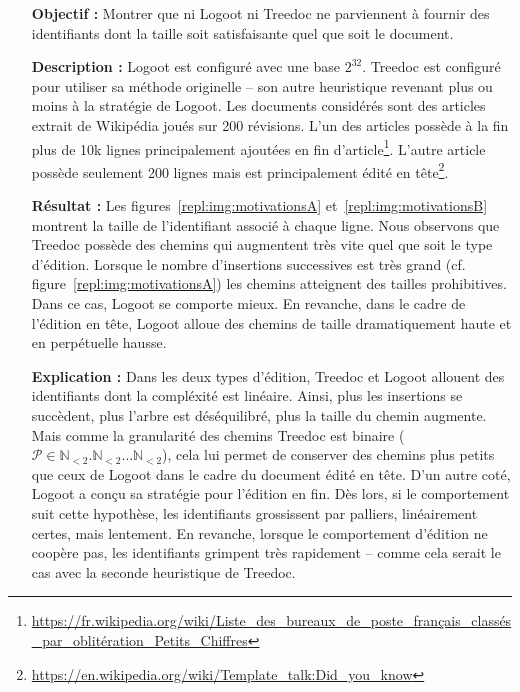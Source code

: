 \begin{itemize}
\item [\textbf{Objectif :}] Montrer que ni Logoot ni Treedoc ne parviennent à
  fournir des identifiants dont la taille soit satisfaisante quel que soit le
  document.
\item [\textbf{Description :}] Logoot est configuré avec une base
  $2^{32}$. Treedoc est configuré pour utiliser sa méthode originelle -- son
  autre heuristique revenant plus ou moins à la stratégie de Logoot. Les
  documents considérés sont des articles extrait de Wikipédia joués sur 200
  révisions. L'un des articles possède à la fin plus de 10k lignes
  principalement ajoutées en fin
  d'article\footnote{\url{https://fr.wikipedia.org/wiki/Liste_des_bureaux_de_poste_français_classés_par_oblitération_Petits_Chiffres}}. L'autre
  article possède seulement 200 lignes mais est principalement édité en
  tête\footnote{\url{https://en.wikipedia.org/wiki/Template_talk:Did_you_know}}.
\item [\textbf{Résultat :}] Les figures~\ref{repl:img:motivationsA}
  et~\ref{repl:img:motivationsB} montrent la taille de l'identifiant associé à
  chaque ligne. Nous observons que Treedoc possède des chemins qui augmentent
  très vite quel que soit le type d'édition. Lorsque le nombre d'insertions
  successives est très grand (cf. figure~\ref{repl:img:motivationsA}) les
  chemins atteignent des tailles prohibitives. Dans ce cas, Logoot se comporte
  mieux. En revanche, dans le cadre de l'édition en tête, Logoot alloue des
  chemins de taille dramatiquement haute et en perpétuelle hausse.
\item [\textbf{Explication :}] Dans les deux types d'édition, Treedoc et Logoot
  allouent des identifiants dont la compléxité est linéaire. Ainsi, plus les
  insertions se succèdent, plus l'arbre est déséquilibré, plus la taille du
  chemin augmente. Mais comme la granularité des chemins Treedoc est binaire
  ($\mathcal{P}\in \mathbb{N}_{<2}.\mathbb{N}_{<2}\ldots\mathbb{N}_{<2}$), cela
  lui permet de conserver des chemins plus petits que ceux de Logoot dans le
  cadre du document édité en tête. D'un autre coté, Logoot a conçu sa stratégie
  pour l'édition en fin. Dès lors, si le comportement suit cette hypothèse, les
  identifiants grossissent par palliers, linéairement certes, mais lentement. En
  revanche, lorsque le comportement d'édition ne coopère pas, les identifiants
  grimpent très rapidement -- comme cela serait le cas avec la seconde
  heuristique de Treedoc.
\end{itemize}


